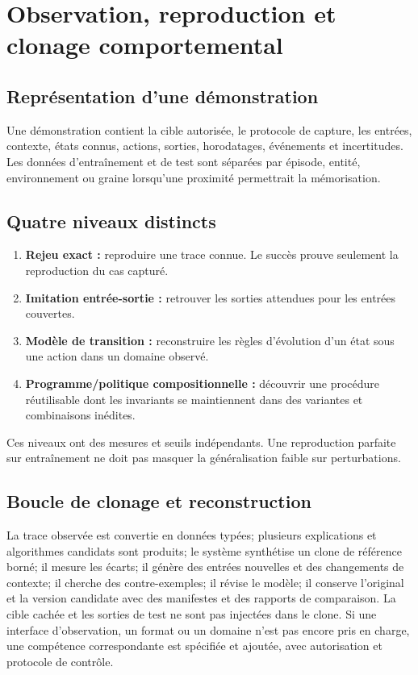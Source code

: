 \documentclass[11pt,a4paper]{article}
\newcommand{\Role}[1]{\textbf{#1}}
\begin{document}
\section{Observation, reproduction et clonage comportemental}
\subsection{Représentation d'une démonstration}
Une démonstration contient la cible autorisée, le protocole de capture, les entrées, contexte, états connus, actions, sorties, horodatages, événements et incertitudes. Les données d'entraînement et de test sont séparées par épisode, entité, environnement ou graine lorsqu'une proximité permettrait la mémorisation.

\subsection{Quatre niveaux distincts}
\begin{enumerate}
\item \Role{Rejeu exact :} reproduire une trace connue. Le succès prouve seulement la reproduction du cas capturé.
\item \Role{Imitation entrée-sortie :} retrouver les sorties attendues pour les entrées couvertes.
\item \Role{Modèle de transition :} reconstruire les règles d'évolution d'un état sous une action dans un domaine observé.
\item \Role{Programme/politique compositionnelle :} découvrir une procédure réutilisable dont les invariants se maintiennent dans des variantes et combinaisons inédites.
\end{enumerate}
Ces niveaux ont des mesures et seuils indépendants. Une reproduction parfaite sur entraînement ne doit pas masquer la généralisation faible sur perturbations.

\subsection{Boucle de clonage et reconstruction}
La trace observée est convertie en données typées; plusieurs explications et algorithmes candidats sont produits; le système synthétise un clone de référence borné; il mesure les écarts; il génère des entrées nouvelles et des changements de contexte; il cherche des contre-exemples; il révise le modèle; il conserve l'original et la version candidate avec des manifestes et des rapports de comparaison. La cible cachée et les sorties de test ne sont pas injectées dans le clone. Si une interface d'observation, un format ou un domaine n'est pas encore pris en charge, une compétence correspondante est spécifiée et ajoutée, avec autorisation et protocole de contrôle.
\end{document}
